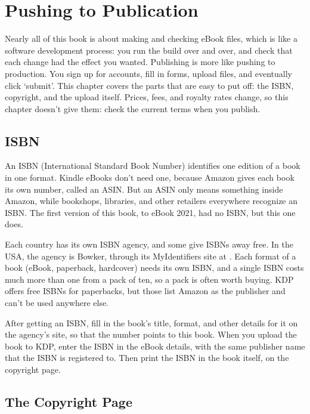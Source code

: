 \chapter{Pushing to Publication}
\label{chapter:publication}

Nearly all of this book is about making and checking eBook files, which is like a software development process: you run the build over and over, and check that each change had the effect you wanted.
Publishing is more like pushing to production.
You sign up for accounts, fill in forms, upload files, and eventually click `submit'.
This chapter covers the parts that are easy to put off: the ISBN, copyright, and the upload itself.
Prices, fees, and royalty rates change, so this chapter doesn't give them: check the current terms when you publish.

\section{ISBN}
\label{sec:isbn}

An ISBN (International Standard Book Number) identifies one edition of a book in one format.
Kindle eBooks don't need one, because Amazon gives each book its own number, called an ASIN.
But an ASIN only means something inside Amazon, while bookshops, libraries, and other retailers everywhere recognize an ISBN.
The first version of this book, \latex to eBook 2021, had no ISBN, but this one does.

Each country has its own ISBN agency, and some give ISBNs away free.
In the USA, the agency is Bowker, through its MyIdentifiers site at .
Each format of a book (eBook, paperback, hardcover) needs its own ISBN, and a single ISBN costs much more than one from a pack of ten, so a pack is often worth buying.
KDP offers free ISBNs for paperbacks, but those list Amazon as the publisher and can't be used anywhere else.

After getting an ISBN, fill in the book's title, format, and other details for it on the agency's site, so that the number points to this book.
When you upload the book to KDP, enter the ISBN in the eBook details, with the same publisher name that the ISBN is registered to.
Then print the ISBN in the book itself, on the copyright page.

\section{The Copyright Page}

